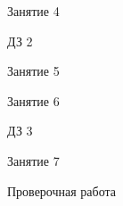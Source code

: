 \begin{class}[number=3]
	\begin{listofex}
		\item 
	\end{listofex}
\end{class}

\begin{class}[number=4]
	\begin{listofex}
		\item Занятие 4
	\end{listofex}
\end{class}

\begin{homework}[number=2]
	\begin{listofex}
		\item ДЗ 2
	\end{listofex}
\end{homework}

\begin{class}[number=5]
	\begin{listofex}
		\item Занятие 5
	\end{listofex}
\end{class}

\begin{class}[number=6]
	\begin{listofex}
		\item Занятие 6
	\end{listofex}
\end{class}

\begin{homework}[number=3]
	\begin{listofex}
		\item ДЗ 3
	\end{listofex}
\end{homework}

\begin{class}[number=7]
	\begin{listofex}
		\item Занятие 7
	\end{listofex}
\end{class}

\begin{exam}
	\begin{listofex}
		\item Проверочная работа
	\end{listofex}
\end{exam}
